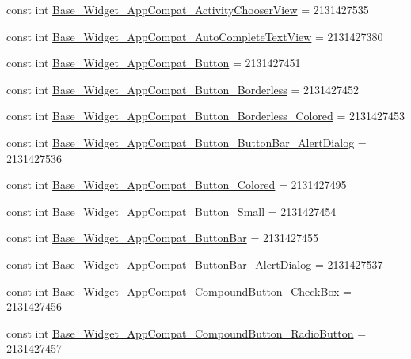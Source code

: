 \begin{CompactItemize}
\item 
const int \hyperlink{class__2doo_1_1_droid_1_1_resource_1_1_style_3b13c34e4fc8d42edc8af363615b12ad}{Base\_\-Widget\_\-AppCompat\_\-ActivityChooserView} = 2131427535
\item 
const int \hyperlink{class__2doo_1_1_droid_1_1_resource_1_1_style_e1fc26a5e18656e6331c152f3fb93835}{Base\_\-Widget\_\-AppCompat\_\-AutoCompleteTextView} = 2131427380
\item 
const int \hyperlink{class__2doo_1_1_droid_1_1_resource_1_1_style_1ce5b06ee8f9e105ee6aa0b90618ab97}{Base\_\-Widget\_\-AppCompat\_\-Button} = 2131427451
\item 
const int \hyperlink{class__2doo_1_1_droid_1_1_resource_1_1_style_fa96571aa8d0a01f802d7c6aeb1e1f4f}{Base\_\-Widget\_\-AppCompat\_\-Button\_\-Borderless} = 2131427452
\item 
const int \hyperlink{class__2doo_1_1_droid_1_1_resource_1_1_style_dfa711641301e026aae011317dd47515}{Base\_\-Widget\_\-AppCompat\_\-Button\_\-Borderless\_\-Colored} = 2131427453
\item 
const int \hyperlink{class__2doo_1_1_droid_1_1_resource_1_1_style_ccf0960a5a91f8a4c3c6abcb6e0f371e}{Base\_\-Widget\_\-AppCompat\_\-Button\_\-ButtonBar\_\-AlertDialog} = 2131427536
\item 
const int \hyperlink{class__2doo_1_1_droid_1_1_resource_1_1_style_c77c238abd3381e277e755edf2474ce7}{Base\_\-Widget\_\-AppCompat\_\-Button\_\-Colored} = 2131427495
\item 
const int \hyperlink{class__2doo_1_1_droid_1_1_resource_1_1_style_a5145f89c26bd6b3b4586d30389dd983}{Base\_\-Widget\_\-AppCompat\_\-Button\_\-Small} = 2131427454
\item 
const int \hyperlink{class__2doo_1_1_droid_1_1_resource_1_1_style_8c1a1e581f6ceba2e4de06e4d79fa693}{Base\_\-Widget\_\-AppCompat\_\-ButtonBar} = 2131427455
\item 
const int \hyperlink{class__2doo_1_1_droid_1_1_resource_1_1_style_bdf69924dde6733748870b35eebbfbda}{Base\_\-Widget\_\-AppCompat\_\-ButtonBar\_\-AlertDialog} = 2131427537
\item 
const int \hyperlink{class__2doo_1_1_droid_1_1_resource_1_1_style_23928667eb5529c5cc46af04aceceaeb}{Base\_\-Widget\_\-AppCompat\_\-CompoundButton\_\-CheckBox} = 2131427456
\item 
const int \hyperlink{class__2doo_1_1_droid_1_1_resource_1_1_style_f4f1a3e5bd6166d1a40e57a3800d37d8}{Base\_\-Widget\_\-AppCompat\_\-CompoundButton\_\-RadioButton} = 2131427457
\item 

\end{CompactItemize}

